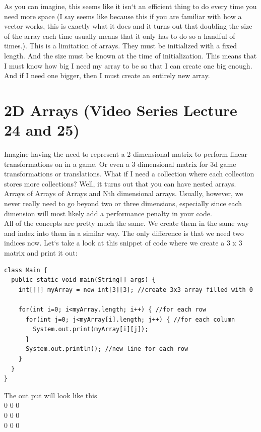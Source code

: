 \documentclass[11]{article}
\begin{document}
As you can imagine, this seems like it isn`t an efficient thing to do every time you need more space (I say seems like because this if you are familiar with how a vector works, this is exactly what it does and it turns out that doubling the size of the array each time usually means that it only has to do so a handful of times.). This is a limitation of arrays. They must be initialized with a fixed length. And the size must be known at the time of initialization. This means that I must know how big I need my array to be so that I can create one big enough. And if I need one bigger, then I must create an entirely new array.

\section{2D Arrays (Video Series Lecture 24 and 25)}
Imagine having the need to represent a 2 dimensional matrix to perform linear transformations on in a game. Or even a 3 dimensional matrix for 3d game transformations or translations. What if I need a collection where each collection stores more collections? Well, it turns out that you can have nested arrays. Arrays of Arrays of Arrays and Nth dimensional arrays. Usually, however, we never really need to go beyond two or three dimensions, especially since each dimension will most likely add a performance penalty in your code.\\

All of the concepts are pretty much the same. We create them in the same way and index into them in a similar way. The only difference is that we need two indices now. Let`s take a look at this snippet of code where we create a $3$ x $3$ matrix and print it out:

\begin{lstlisting}
class Main {
  public static void main(String[] args) {
    int[][] myArray = new int[3][3]; //create 3x3 array filled with 0

    for(int i=0; i<myArray.length; i++) { //for each row
      for(int j=0; j<myArray[i].length; j++) { //for each column
        System.out.print(myArray[i][j]);
      }
      System.out.println(); //new line for each row
    } 
  }
}
\end{lstlisting}

The out put will look like this\\
0 0 0\\0 0 0\\ 0 0 0\\
\end{document}
